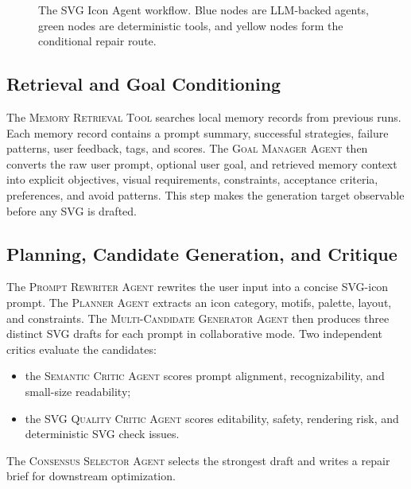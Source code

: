 \documentclass[10pt]{article}
\newcommand{\tool}[1]{\textsc{#1}}
\newcommand{\agent}[1]{\textsc{#1}}
\newcommand{\project}{SVG Icon Agent}
\begin{document}
\begin{figure}[t]
{
}
\caption{The \project{} workflow. Blue nodes are LLM-backed agents, green nodes are deterministic tools, and yellow nodes form the conditional repair route.}
\label{fig:pipeline}
\end{figure}

\subsection{Retrieval and Goal Conditioning}

The \tool{Memory Retrieval Tool} searches local memory records from previous runs.
Each memory record contains a prompt summary, successful strategies, failure patterns, user feedback, tags, and scores.
The \agent{Goal Manager Agent} then converts the raw user prompt, optional user goal, and retrieved memory context into explicit objectives, visual requirements, constraints, acceptance criteria, preferences, and avoid patterns.
This step makes the generation target observable before any SVG is drafted.

\subsection{Planning, Candidate Generation, and Critique}

The \agent{Prompt Rewriter Agent} rewrites the user input into a concise SVG-icon prompt.
The \agent{Planner Agent} extracts an icon category, motifs, palette, layout, and constraints.
The \agent{Multi-Candidate Generator Agent} then produces three distinct SVG drafts for each prompt in collaborative mode.
Two independent critics evaluate the candidates:
\begin{itemize}[leftmargin=1.5em,itemsep=0.2em]
  \item the \agent{Semantic Critic Agent} scores prompt alignment, recognizability, and small-size readability;
  \item the \agent{SVG Quality Critic Agent} scores editability, safety, rendering risk, and deterministic SVG check issues.
\end{itemize}
The \agent{Consensus Selector Agent} selects the strongest draft and writes a repair brief for downstream optimization.
\end{document}
